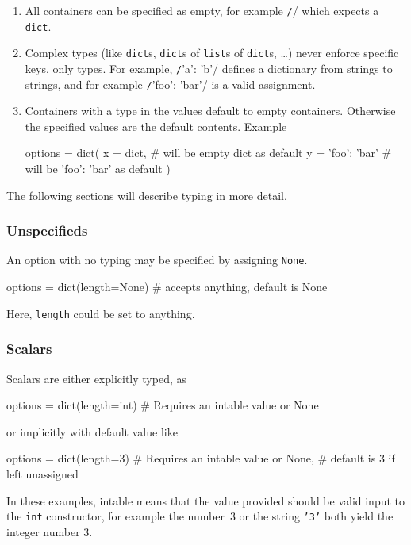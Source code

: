 \begin{enumerate}
\item All containers can be specified as empty, for example
  \texttt/{}/ which expects a \texttt{dict}.

\item Complex types (like \texttt{dict}s, \texttt{dict}s of
  \texttt{list}s of \texttt{dict}s, \dots) never enforce specific
  keys, only types.  For example, \texttt/{'a': 'b'}/
  defines a dictionary from strings to strings, and for example
  \texttt/{'foo': 'bar'}/ is a valid
  assignment.

\item Containers with a type in the values default to empty containers.
  Otherwise the specified values are the default contents.  Example
  \begin{python}
options = dict(
    x = dict,           # will be empty dict as default
    y = {'foo': 'bar'}  # will be {'foo': 'bar'} as default
)
  \end{python}
\end{enumerate}

The following sections will describe typing in more detail.



\subsubsection{Unspecifieds}
An option with no typing may be specified by assigning \texttt{None}.
\begin{python}
options = dict(length=None)  # accepts anything, default is None
\end{python}
Here, \texttt{length} could be set to anything.



\subsubsection*{Scalars}
Scalars are either explicitly typed, as
\begin{python}
options = dict(length=int)   # Requires an intable value or None
\end{python}
or implicitly with default value like
\begin{python}
options = dict(length=3)     # Requires an intable value or None,
                             # default is 3 if left unassigned
\end{python}
In these examples, intable means that the value provided should be
valid input to the \texttt{int} constructor, for example the number~3
or the string \texttt{'3'} both yield the integer number 3.



